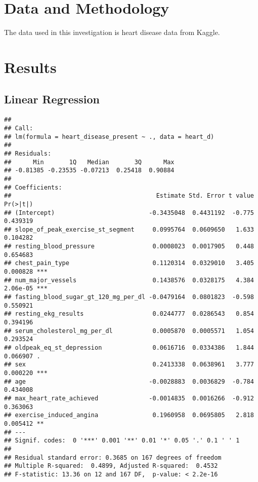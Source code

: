 \documentclass[11pt,preprint, authoryear]{elsarticle}
\numberwithin{equation}{section}
\numberwithin{figure}{section}
\numberwithin{table}{section}
\begin{document}
\hypertarget{data-and-methodology}{%
\section{Data and Methodology}\label{data-and-methodology}}

The data used in this investigation is heart disease data from Kaggle.

\hypertarget{results}{%
\section{Results}\label{results}}

\hypertarget{linear-regression}{%
\subsection{Linear Regression}\label{linear-regression}}

\begin{verbatim}
## 
## Call:
## lm(formula = heart_disease_present ~ ., data = heart_d)
## 
## Residuals:
##      Min       1Q   Median       3Q      Max 
## -0.81385 -0.23535 -0.07213  0.25418  0.90884 
## 
## Coefficients:
##                                        Estimate Std. Error t value Pr(>|t|)    
## (Intercept)                          -0.3435048  0.4431192  -0.775 0.439319    
## slope_of_peak_exercise_st_segment     0.0995764  0.0609650   1.633 0.104282    
## resting_blood_pressure                0.0008023  0.0017905   0.448 0.654683    
## chest_pain_type                       0.1120314  0.0329010   3.405 0.000828 ***
## num_major_vessels                     0.1438576  0.0328175   4.384 2.06e-05 ***
## fasting_blood_sugar_gt_120_mg_per_dl -0.0479164  0.0801823  -0.598 0.550921    
## resting_ekg_results                   0.0244777  0.0286543   0.854 0.394196    
## serum_cholesterol_mg_per_dl           0.0005870  0.0005571   1.054 0.293524    
## oldpeak_eq_st_depression              0.0616716  0.0334386   1.844 0.066907 .  
## sex                                   0.2413338  0.0638961   3.777 0.000220 ***
## age                                  -0.0028883  0.0036829  -0.784 0.434008    
## max_heart_rate_achieved              -0.0014835  0.0016266  -0.912 0.363063    
## exercise_induced_angina               0.1960958  0.0695805   2.818 0.005412 ** 
## ---
## Signif. codes:  0 '***' 0.001 '**' 0.01 '*' 0.05 '.' 0.1 ' ' 1
## 
## Residual standard error: 0.3685 on 167 degrees of freedom
## Multiple R-squared:  0.4899, Adjusted R-squared:  0.4532 
## F-statistic: 13.36 on 12 and 167 DF,  p-value: < 2.2e-16
\end{verbatim}
\end{document}
